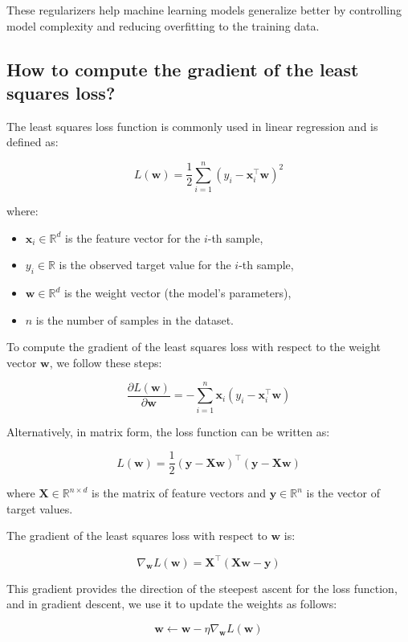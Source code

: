 These regularizers help machine learning models generalize better by controlling model complexity and reducing overfitting to the training data.


\subsection{How to compute the gradient of the least squares loss?}

The least squares loss function is commonly used in linear regression and is defined as:

\[
L(\mathbf{w}) = \frac{1}{2} \sum_{i=1}^{n} (y_i - \mathbf{x}_i^\top \mathbf{w})^2
\]

where:
\begin{itemize}
    \item \( \mathbf{x}_i \in \mathbb{R}^d \) is the feature vector for the \(i\)-th sample,
    \item \( y_i \in \mathbb{R} \) is the observed target value for the \(i\)-th sample,
    \item \( \mathbf{w} \in \mathbb{R}^d \) is the weight vector (the model's parameters),
    \item \( n \) is the number of samples in the dataset.
\end{itemize}

To compute the gradient of the least squares loss with respect to the weight vector \( \mathbf{w} \), we follow these steps:

\[
\frac{\partial L(\mathbf{w})}{\partial \mathbf{w}} = -\sum_{i=1}^{n} \mathbf{x}_i (y_i - \mathbf{x}_i^\top \mathbf{w})
\]

Alternatively, in matrix form, the loss function can be written as:

\[
L(\mathbf{w}) = \frac{1}{2} (\mathbf{y} - \mathbf{Xw})^\top (\mathbf{y} - \mathbf{Xw})
\]

where \( \mathbf{X} \in \mathbb{R}^{n \times d} \) is the matrix of feature vectors and \( \mathbf{y} \in \mathbb{R}^n \) is the vector of target values.

The gradient of the least squares loss with respect to \( \mathbf{w} \) is:

\[
\nabla_{\mathbf{w}} L(\mathbf{w}) = \mathbf{X}^\top (\mathbf{Xw} - \mathbf{y})
\]

This gradient provides the direction of the steepest ascent for the loss function, and in gradient descent, we use it to update the weights as follows:

\[
\mathbf{w} \leftarrow \mathbf{w} - \eta \nabla_{\mathbf{w}} L(\mathbf{w})
\]

